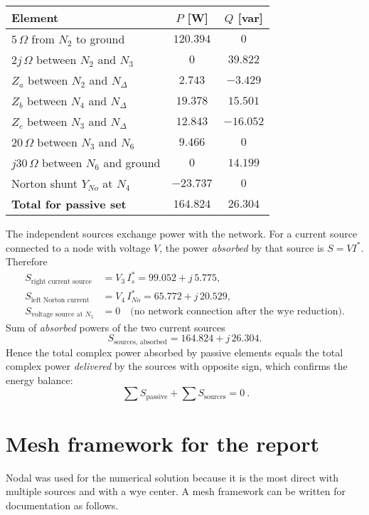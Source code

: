 \documentclass{article}
\begin{document}
\begin{center}
\begin{tabular}{lcc}
\toprule
Element & $P$ [W] & $Q$ [var]\\
\midrule
$5\,\Omega$ from $N_2$ to ground & $120.394$ & $0$\\
$2j\,\Omega$ between $N_2$ and $N_3$ & $0$ & $39.822$\\
$Z_a$ between $N_2$ and $N_{\Delta}$ & $2.743$ & $-3.429$\\
$Z_b$ between $N_4$ and $N_{\Delta}$ & $19.378$ & $15.501$\\
$Z_c$ between $N_3$ and $N_{\Delta}$ & $12.843$ & $-16.052$\\
$20\,\Omega$ between $N_3$ and $N_6$ & $9.466$ & $0$\\
$j30\,\Omega$ between $N_6$ and ground & $0$ & $14.199$\\
Norton shunt $Y_{No}$ at $N_4$ & $-23.737$ & $0$\\
\midrule
\textbf{Total for passive set} & $\mathbf{164.824}$ & $\mathbf{26.304}$\\
\bottomrule
\end{tabular}
\end{center}

The independent sources exchange power with the network. For a current source connected to a node with voltage $V$, the power \emph{absorbed} by that source is $S = V I^{*}$. Therefore
\[
\begin{aligned}
S_{\text{right current source}} &= V_3\,I_s^{*} = 99.052 + j\,5.775,\\
S_{\text{left Norton current}} &= V_4\,I_{No}^{*} = 65.772 + j\,20.529,\\
S_{\text{voltage source at }N_5} &= 0\quad\text{(no network connection after the wye reduction)}.
\end{aligned}
\]
Sum of \emph{absorbed} powers of the two current sources
\[
S_{\text{sources, absorbed}} = 164.824 + j\,26.304.
\]
Hence the total complex power absorbed by passive elements equals the total complex power \emph{delivered} by the sources with opposite sign, which confirms the energy balance:
\[
\boxed{\ \sum S_{\text{passive}} + \sum S_{\text{sources}} = 0\ }.
\]

\section*{Mesh framework for the report}
Nodal was used for the numerical solution because it is the most direct with multiple sources and with a wye center. A mesh framework can be written for documentation as follows.
\end{document}
